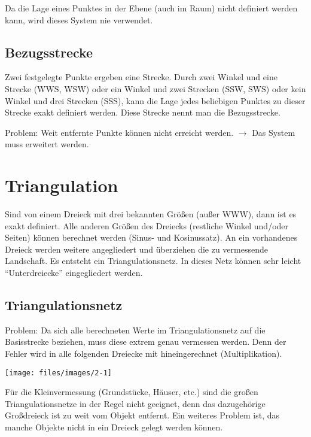 Da die Lage eines Punktes in der Ebene (auch im Raum) nicht definiert werden kann, wird dieses System nie verwendet.

\subsection{Bezugsstrecke}

Zwei festgelegte Punkte ergeben eine Strecke.
Durch zwei Winkel und eine Strecke (WWS, WSW) oder ein Winkel und zwei Strecken (SSW, SWS) oder
kein Winkel und drei Strecken (SSS), kann die Lage jedes beliebigen Punktes zu dieser Strecke
exakt definiert werden.
Diese Strecke nennt man die Bezugsstrecke.
\begin{list}{}{}
	\item[Problem:] Weit entfernte Punkte können nicht erreicht werden.
		$\rightarrow$ Das System muss erweitert werden.
\end{list}

\section{Triangulation}
Sind von einem Dreieck mit drei bekannten Größen (außer WWW), dann ist es exakt definiert.
Alle anderen Größen des Dreiecks (restliche Winkel und/oder Seiten) können berechnet werden (Sinus- und Kosinussatz).
An ein vorhandenes Dreieck werden weitere angegliedert und überziehen die zu vermessende Landschaft.
Es entsteht ein Triangulationsnetz. In dieses Netz können sehr leicht \enquote{Unterdreiecke} eingegliedert werden.

\subsection{Triangulationsnetz}
\begin{list}{}{}
	\item[Problem:] Da sich alle berechneten Werte im Triangulationsnetz auf die Basisstrecke
		beziehen, muss diese extrem genau vermessen werden.
		Denn der Fehler wird in alle folgenden Dreiecke mit hineingerechnet (Multiplikation).
\end{list}

\begin{minipage}{3cm}
	\texttt{[image: files/images/2-1]}
\end{minipage}
\hfill
\begin{minipage}{13.5cm}
Für die Kleinvermessung (Grundstücke, Häuser, etc.) sind die großen Triangulationsnetze in der Regel nicht geeignet, denn
das dazugehörige Großdreieck ist zu weit vom Objekt entfernt. Ein weiteres Problem ist, das manche Objekte nicht in ein
Dreieck gelegt werden können.
\end{minipage}

